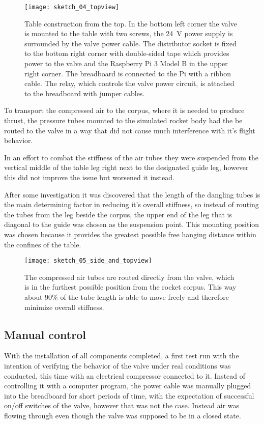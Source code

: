 \begin{figure}[h]
\centering

\texttt{[image: sketch\_04\_topview]}

\caption{Table construction from the top. In the bottom left corner the valve is mounted to the table with two screws, the \SI{24}{\volt} power supply is surrounded by the valve power cable. The distributor socket is fixed to the bottom right corner with double-sided tape which provides power to the valve and the Raspberry Pi 3 Model B in the upper right corner. The breadboard is connected to the Pi with a ribbon cable. The relay, which controls the valve power circuit, is attached to the breadboard with jumper cables.}
\end{figure}

To transport the compressed air to the corpus, where it is needed to produce thrust, the pressure tubes mounted to the simulated rocket body had the be routed to the valve in a way that did not cause much interference with it's flight behavior. 

In an effort to combat the stiffness of the air tubes they were suspended from the vertical middle of the table leg right next to the designated guide leg, however this did not improve the issue but worsened it instead. 

After some investigation it was discovered that the length of the dangling tubes is the main determining factor in reducing it's overall stiffness, so instead of routing the tubes from the leg beside the corpus, the upper end of the leg that is diagonal to the guide was chosen as the suspension point. This mounting position was chosen because it provides the greatest possible free hanging distance within the confines of the table.

\begin{figure}[h]
\centering

\texttt{[image: sketch\_05\_side\_and\_topview]}

\caption{The compressed air tubes are routed directly from the valve, which is in the furthest possible position from the rocket corpus. This way about 90\% of the tube length is able to move freely and therefore minimize overall stiffness.}
\end{figure}


\subsection{Manual control}
With the installation of all components completed, a first test run with the intention of verifying the behavior of the valve under real conditions was conducted, this time with an electrical compressor connected to it. Instead of controlling it with a computer program, the power cable was manually plugged into the breadboard for short periods of time, with the expectation of successful on/off switches of the valve, however that was not the case. Instead air was flowing through even though the valve was supposed to be in a closed state. 

